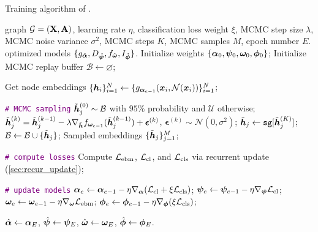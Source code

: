 \begin{algorithm}[!t]
\caption{Training algorithm of \shortname.}
\label{algo:training_clebm}
\begin{algorithmic}[1]

\REQUIRE graph $\mathcal{G} = (\mathbf{X}, \mathbf{A})$, learning rate $\eta$, classification loss weight $\xi$, MCMC step size $\lambda$, MCMC noise variance $\sigma^2$, MCMC steps $K$, MCMC samples $M$, epoch number $E$. 
\ENSURE optimized models $\{ g_{\hat{{\bm{\alpha}}}}, D_{\hat{{\bm{\psi}}}}, f_{\hat{{\bm{\omega}}}}, I_{\hat{{\bm{\phi}}}} \}$. 
\STATE Initialize weights $\{ {\bm{\alpha}}_0, {\bm{\psi}}_0, {\bm{\omega}}_0, {\bm{\phi}}_0 \}$; 
\STATE Initialize MCMC replay buffer $\mathcal{B} \leftarrow \varnothing$; 


    \STATE Get node embeddings $\{{\bm{h}}_i\}_{i=1}^{N} \leftarrow \{ g_{{\bm{\alpha}}_{e-1}}({\bm{x}}_i, \mathcal{N}({\bm{x}}_i)) \}_{i=1}^{N}$; 

    \STATE
    \STATE \texttt{\textcolor{purple}{\# MCMC sampling}}
        \STATE $\Tilde{{\bm{h}}}_j^{(0)} \sim \mathcal{B}$ with $95\%$ probability and $\mathcal{U}$ otherwise; 
            \STATE $\Tilde{{\bm{h}}}_j^{(k)} = \Tilde{{\bm{h}}}_j^{(k-1)} - \lambda \nabla_{\Tilde{{\bm{h}}}}f_{{\bm{\omega}}_{e-1}}(\Tilde{{\bm{h}}}_j^{(k-1)}) + \bm{\epsilon}^{(k)}$, $\bm{\epsilon}^{(k)} \sim \mathcal{N}(0, \sigma^2)$; 
        \ENDFOR
        \STATE $\Tilde{{\bm{h}}}_j \leftarrow \texttt{sg}[\Tilde{{\bm{h}}}_j^{(K)}]$; 
        \STATE $\mathcal{B} \leftarrow \mathcal{B} \cup \{\Tilde{{\bm{h}}}_j\}$; 
    \ENDFOR
    \STATE Sampled embeddings $\{\Tilde{{\bm{h}}}_j\}_{j=1}^{M}$; 

    \STATE
    \STATE \texttt{\textcolor{purple}{\# compute losses}}
    \STATE Compute $\mathcal{L}_{\text{ebm}}$, $\mathcal{L}_{\text{cl}}$, and $\mathcal{L}_{\text{cls}}$ via recurrent update (\cref{sec:recur_update}); 

    \STATE
    \STATE \texttt{\textcolor{purple}{\# update models}}
    \STATE ${\bm{\alpha}}_{e} \leftarrow {\bm{\alpha}}_{e-1} - \eta\nabla_{{\bm{\alpha}}}(\mathcal{L}_{\text{cl}} +  \xi \mathcal{L}_{\text{cls}})$; 
    \STATE ${\bm{\psi}}_{e} \leftarrow {\bm{\psi}}_{e-1} - \eta\nabla_{{\bm{\psi}}}\mathcal{L}_\text{cl}$; 
    \STATE ${\bm{\omega}}_{e} \leftarrow {\bm{\omega}}_{e-1} - \eta\nabla_{{\bm{\omega}}}\mathcal{L}_\text{ebm}$; 
    \STATE ${\bm{\phi}}_{e} \leftarrow {\bm{\phi}}_{e-1} - \eta\nabla_{{\bm{\phi}}}(\xi \mathcal{L}_\text{cls})$; 

\ENDFOR
\STATE $\hat{{\bm{\alpha}}} \leftarrow {\bm{\alpha}}_E$, $\hat{{\bm{\psi}}} \leftarrow {\bm{\psi}}_E$, $\hat{{\bm{\omega}}} \leftarrow {\bm{\omega}}_E$, $\hat{{\bm{\phi}}} \leftarrow {\bm{\phi}}_E$. 

\end{algorithmic}
\end{algorithm}